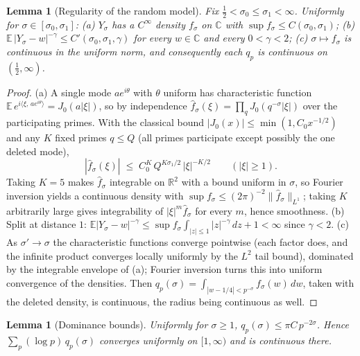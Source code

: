 \documentclass[11pt]{article}
\numberwithin{equation}{section}
\theoremstyle{plain}
\newtheorem{lemma}[theorem]{Lemma}
\theoremstyle{definition}
\theoremstyle{remark}
\begin{document}
\begin{lemma}[Regularity of the random model]\label{lem:regularity}
Fix $\tfrac12 < \sigma_0 \le \sigma_1 < \infty$. Uniformly for
$\sigma \in [\sigma_0, \sigma_1]$:
(a) $Y_\sigma$ has a $C^\infty$ density $f_\sigma$ on $\mathbb{C}$ with
$\sup f_\sigma \le C(\sigma_0, \sigma_1)$;
(b) $\mathbb{E}\,|Y_\sigma - w|^{-\gamma} \le C'(\sigma_0, \sigma_1, \gamma)$ for
every $w \in \mathbb{C}$ and every $0 < \gamma < 2$;
(c) $\sigma \mapsto f_\sigma$ is continuous in the uniform norm, and consequently
each $q_p$ is continuous on $(\tfrac12, \infty)$.
\end{lemma}

\begin{proof}
(a) A single mode $a e^{i\theta}$ with $\theta$ uniform has characteristic function
$\mathbb{E}\, e^{i\langle \xi,\, a e^{i\theta}\rangle} = J_0(a|\xi|)$, so by
independence $\widehat{f}_\sigma(\xi) = \prod_q J_0(q^{-\sigma}|\xi|)$ over the
participating primes. With the classical bound $|J_0(x)| \le \min(1, C_0 x^{-1/2})$
and any $K$ fixed primes $q \le Q$ (all primes participate except possibly the one
deleted mode),
\[
|\widehat{f}_\sigma(\xi)| \;\le\; C_0^K\, Q^{K\sigma_1/2}\, |\xi|^{-K/2}
\qquad (|\xi| \ge 1).
\]
Taking $K = 5$ makes $\widehat{f}_\sigma$ integrable on $\mathbb{R}^2$ with a bound
uniform in $\sigma$, so Fourier inversion yields a continuous density with
$\sup f_\sigma \le (2\pi)^{-2}\|\widehat{f}_\sigma\|_{L^1}$; taking $K$ arbitrarily
large gives integrability of $|\xi|^m \widehat{f}_\sigma$ for every $m$, hence
smoothness. (b) Split at distance $1$:
$\mathbb{E}|Y_\sigma - w|^{-\gamma} \le \sup f_\sigma \int_{|z|\le1} |z|^{-\gamma}\,
dz + 1 < \infty$ since $\gamma < 2$. (c) As $\sigma' \to \sigma$ the characteristic
functions converge pointwise (each factor does, and the infinite product converges
locally uniformly by the $L^2$ tail bound), dominated by the integrable envelope of
(a); Fourier inversion turns this into uniform convergence of the densities. Then
$q_p(\sigma) = \int_{|w - 1/4| < p^{-\sigma}} f_\sigma(w)\, dw$, taken with the
deleted density, is continuous, the radius being continuous as well.
\end{proof}

\begin{lemma}[Dominance bounds]\label{lem:qbound}
Uniformly for $\sigma \ge 1$, $q_p(\sigma) \le \pi C\, p^{-2\sigma}$. Hence
$\sum_p (\log p)\, q_p(\sigma)$ converges uniformly on $[1, \infty)$ and is
continuous there.
\end{lemma}
\end{document}
